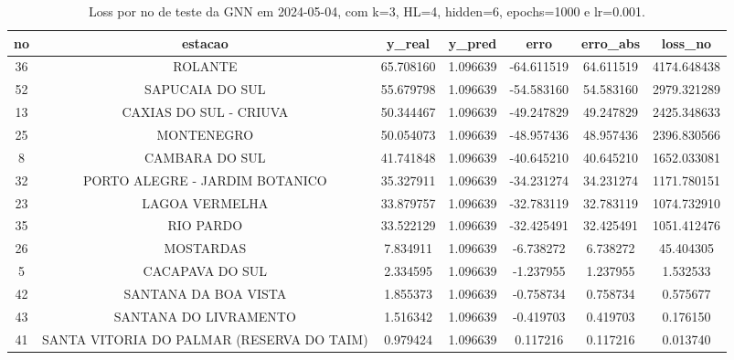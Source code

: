 \begin{table}[h]
\centering
\caption{Loss por no de teste da GNN em 2024-05-04, com k=3, HL=4, hidden=6, epochs=1000 e lr=0.001.}
\label{tab:gnn_loss_k3_hl4_h6_e1000_d20240504}
\begin{tabular}{ccccccc}
\toprule
no & estacao & y\_real & y\_pred & erro & erro\_abs & loss\_no \\
\midrule
36 & ROLANTE & 65.708160 & 1.096639 & -64.611519 & 64.611519 & 4174.648438 \\
52 & SAPUCAIA DO SUL & 55.679798 & 1.096639 & -54.583160 & 54.583160 & 2979.321289 \\
13 & CAXIAS DO SUL - CRIUVA & 50.344467 & 1.096639 & -49.247829 & 49.247829 & 2425.348633 \\
25 & MONTENEGRO & 50.054073 & 1.096639 & -48.957436 & 48.957436 & 2396.830566 \\
8 & CAMBARA DO SUL & 41.741848 & 1.096639 & -40.645210 & 40.645210 & 1652.033081 \\
32 & PORTO ALEGRE - JARDIM BOTANICO & 35.327911 & 1.096639 & -34.231274 & 34.231274 & 1171.780151 \\
23 & LAGOA VERMELHA & 33.879757 & 1.096639 & -32.783119 & 32.783119 & 1074.732910 \\
35 & RIO PARDO & 33.522129 & 1.096639 & -32.425491 & 32.425491 & 1051.412476 \\
26 & MOSTARDAS & 7.834911 & 1.096639 & -6.738272 & 6.738272 & 45.404305 \\
5 & CACAPAVA DO SUL & 2.334595 & 1.096639 & -1.237955 & 1.237955 & 1.532533 \\
42 & SANTANA DA BOA VISTA & 1.855373 & 1.096639 & -0.758734 & 0.758734 & 0.575677 \\
43 & SANTANA DO LIVRAMENTO & 1.516342 & 1.096639 & -0.419703 & 0.419703 & 0.176150 \\
41 & SANTA VITORIA DO PALMAR (RESERVA DO TAIM) & 0.979424 & 1.096639 & 0.117216 & 0.117216 & 0.013740 \\
\bottomrule
\end{tabular}
\end{table}
